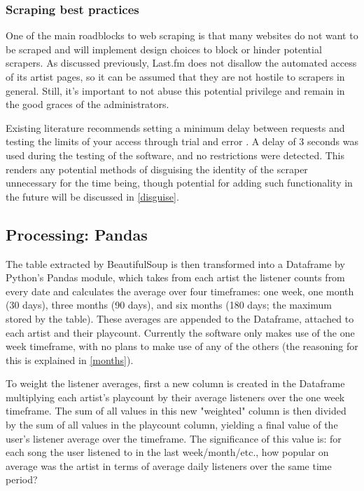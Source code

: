 
\subsubsection{Scraping best practices}

One of the main roadblocks to web scraping is that many websites do not want to be scraped and will implement design choices to block or hinder potential scrapers. As discussed previously, Last.fm does not disallow the automated access of its artist pages, so it can be assumed that they are not hostile to scrapers in general. Still, it's important to not abuse this potential privilege and remain in the good graces of the administrators.

Existing literature recommends setting a minimum delay between requests and testing the limits of your access through trial and error \cite{mitchell_web_2015}. A delay of 3 seconds was used during the testing of the software, and no restrictions were detected. This renders any potential methods of disguising the identity of the scraper unnecessary for the time being, though potential for adding such functionality in the future will be discussed in \autoref{disguise}.

\subsection{Processing: Pandas}\label{pandas}

The table extracted by BeautifulSoup is then transformed into a Dataframe by Python's Pandas module, which takes from each artist the listener counts from every date and calculates the average over four timeframes: one week, one month (30 days), three months (90 days), and six months (180 days; the maximum stored by the table). These averages are appended to the Dataframe, attached to each artist and their playcount. Currently the software only makes use of the one week timeframe, with no plans to make use of any of the others (the reasoning for this is explained in \autoref{months}).

To weight the listener averages, first a new column is created in the Dataframe multiplying each artist's playcount by their average listeners over the one week timeframe. The sum of all values in this new "weighted" column is then divided by the sum of all values in the playcount column, yielding a final value of the user's listener average over the timeframe. The significance of this value is: for each song the user listened to in the last week/month/etc., how popular on average was the artist in terms of average daily listeners over the same time period?

